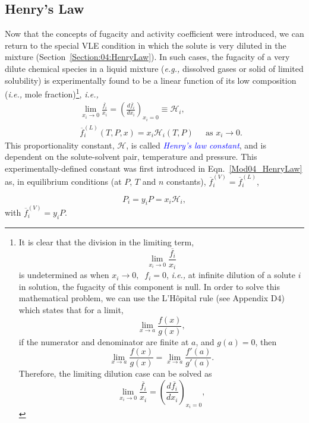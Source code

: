 \documentclass[12pts,a4paper,amsmath,amssymb,floatfix]{article}%
\newcommand{\frc}{\displaystyle\frac}
\newcommand{\blue}{\textcolor{blue}}
\newcommand{\eg}{{\it e.g., }}
\newcommand{\ie}{{\it i.e., }}
\newcommand{\mfr}[3][error]{#1_{#2}^{\left(#3\right)}}
\begin{document}
\subsection{Henry's Law}\label{Section:05:HenryLaw}
Now that the concepts of fugacity and activity coefficient were introduced, we can return to the special VLE condition in which the solute is very diluted in the mixture (Section~\ref{Section:04:HenryLaw}). In such cases, the fugacity of a very dilute chemical species in a liquid mixture (\eg dissolved gases or solid of limited solubility) is experimentally found to be a linear function of its low composition (\ie mole fraction)\footnote{It is clear that the division in the limiting term,
  \begin{displaymath}
    \lim\limits_{x_{i}\rightarrow 0}\frc{\overline{f_{i}}}{x_{i}}
  \end{displaymath}
  is undetermined as when $x_{i}\rightarrow 0,\;\;f_{i}=0$, \ie at infinite dilution of a solute $i$ in solution, the fugacity of this component is null. In order to solve this mathematical problem, we can use the L'H\^opital rule (see Appendix D4) which states that for a limit,
         \begin{displaymath}
                 \lim\limits_{x\rightarrow a}\frc{f(x)}{g(x)},
         \end{displaymath}
         if the numerator and denominator are finite at $a$, and $g(a)=0$, then
         \begin{displaymath}
                 \lim\limits_{x\rightarrow a}\frc{f(x)}{g(x)} =  \lim\limits_{x\rightarrow a}\frc{f'(a)}{g'(a)}.
         \end{displaymath}
         Therefore, the limiting dilution case can be solved as
         \begin{displaymath}
                 \lim\limits_{x_{i}\rightarrow 0}\frc{\overline{f_{i}}}{x_{i}} = \left(\frc{d \overline{f_{i}}}{d x_{i}}\right)_{x_{i}=0},
         \end{displaymath}
}, \ie   
      \begin{eqnarray}
        && \lim\limits_{x_{i}\rightarrow 0}\frc{\overline{f_{i}}}{x_{i}} = \left(\frc{d \overline{f_{i}}}{d x_{i}}\right)_{x_{i}=0}  \equiv \mathcal{H}_{i}, \nonumber \\
        && \mfr[\overline{f}]{i}{L}(T,P,x) = x_{i}\mathcal{H}_{i}(T,P)\;\;\;\;\text{ as } x_{i}\rightarrow 0.
      \end{eqnarray}      
This proportionality constant, $\mathcal{H}$, is called \blue{\it Henry's law constant}, and is dependent on the solute-solvent pair, temperature and pressure. This experimentally-defined constant was first introduced in Eqn.~\ref{Mod04_HenryLaw} as, in equilibrium conditions (at $P$, $T$ and $n$ constants), $\mfr[\overline{f}]{i}{V}=\mfr[\overline{f}]{i}{L}$,
         \begin{shaded}
           \begin{displaymath}
             P_{i} = y_{i}P = x_{i}\mathcal{H}_{i},
           \end{displaymath}
           with $\mfr[\overline{f}]{i}{V}=y_{i}P$.
        \end{shaded}
%
\end{document}
